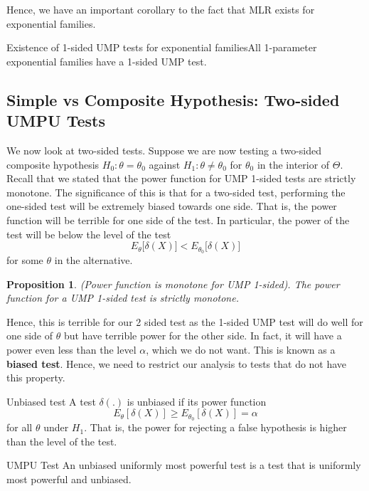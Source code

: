 \documentclass[twoside]{article}
\newtheorem{proposition}[theorem]{Proposition}
\begin{document}
Hence, we have an important corollary to the fact that MLR exists for exponential families.

\begin{proposition_exam}{Existence of 1-sided UMP tests for exponential families}{}All 1-parameter exponential families have a 1-sided UMP test.
\end{proposition_exam}
\subsection{Simple vs Composite Hypothesis: Two-sided UMPU Tests}
We now look at two-sided tests. Suppose we are now testing a two-sided composite hypothesis $H_0: \theta = \theta_0$ against $H_1: \theta \neq \theta_0$ for $\theta_0$ in the interior of $\Theta.$\\

Recall that we stated that the power function for UMP 1-sided tests are strictly monotone. The significance of this is that for a two-sided test, performing the one-sided test will be extremely biased towards one side. That is, the power function will be terrible for one side of the test. In particular, the power of the test will be below the level of the test
$$
E_{\theta}\big[\delta(X) \big] < E_{\theta_{0}}\big[\delta(X) \big]
$$
for some $\theta$ in the alternative. 
\begin{proposition}(Power function is monotone for UMP 1-sided). The power function for a UMP 1-sided test is strictly monotone.
\end{proposition}
Hence, this is terrible for our 2 sided test as the 1-sided UMP test will do well for one side of $\theta$ but have terrible power for the other side. In fact, it will have a power even less than the level $\alpha$, which we do not want. This is known as a \textbf{biased test}. Hence, we need to restrict our analysis to tests that do not have this property.


\begin{definition_exam}{Unbiased test}{} A test $\delta(.)$ is unbiased if its power function 
$$
E_{\theta}[\delta(X)] \geq E_{\theta_{0}}[\delta(X)] = \alpha
$$
for all $\theta$ under $H_1$.
That is, the power for rejecting a false hypothesis is higher than the level of the test.
\end{definition_exam}

\begin{definition_exam}{UMPU Test}{} An unbiased uniformly most powerful test is a test that is uniformly most powerful and unbiased.
\end{definition_exam}
\end{document}
